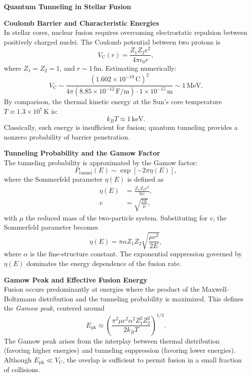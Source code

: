 \begin{technical}
    {\Large\textbf{Quantum Tunneling in Stellar Fusion}}
    
    \textbf{Coulomb Barrier and Characteristic Energies}\\[0.5em]
    In stellar cores, nuclear fusion requires overcoming electrostatic repulsion between positively charged nuclei. The Coulomb potential between two protons is
    \[
    V_\text{C}(r) = \frac{Z_1 Z_2 e^2}{4\pi \epsilon_0 r},
    \]
    where \( Z_1 = Z_2 = 1 \), and \( r \sim 1\,\text{fm} \). Estimating numerically:
    \[
    V_\text{C} \sim \frac{(1.602 \times 10^{-19}\,\text{C})^2}{4\pi (8.85 \times 10^{-12}\,\text{F/m}) \cdot 1 \times 10^{-15}\,\text{m}} \sim 1\,\text{MeV}.
    \]
    By comparison, the thermal kinetic energy at the Sun’s core temperature \( T \approx 1.3 \times 10^7\,\text{K} \) is:
    \[
    k_B T \approx 1\,\text{keV}.
    \]
    Classically, such energy is insufficient for fusion; quantum tunneling provides a nonzero probability of barrier penetration.
    
    \vspace{0.7em}
    \textbf{Tunneling Probability and the Gamow Factor}\\[0.5em]
    The tunneling probability is approximated by the Gamow factor:
    \[
    P_\text{tunnel}(E) \sim \exp\left[-2\pi \eta(E)\right],
    \]
    where the Sommerfeld parameter \(\eta(E)\) is defined as
    \begin{align*}
    \eta(E) &= \frac{Z_1 Z_2 e^2}{\hbar v}, \\
    v &= \sqrt{\frac{2E}{\mu}},
    \end{align*}
    with \(\mu\) the reduced mass of the two-particle system. Substituting for \(v\), the Sommerfeld parameter becomes
    \[
    \eta(E) = \pi \alpha Z_1 Z_2 \sqrt{\frac{\mu c^2}{2E}},
    \]
    where \(\alpha\) is the fine-structure constant. The exponential suppression governed by \(\eta(E)\) dominates the energy dependence of the fusion rate.
    
    \vspace{0.7em}
    \textbf{Gamow Peak and Effective Fusion Energy}\\[0.5em]
    Fusion occurs predominantly at energies where the product of the Maxwell–Boltzmann distribution and the tunneling probability is maximized. This defines the \emph{Gamow peak}, centered around
    \[
    E_\text{pk} \approx \left( \frac{\pi^2 \mu c^2 \alpha^2 Z_1^2 Z_2^2}{2 k_B T} \right)^{1/3}.
    \]
    The Gamow peak arises from the interplay between thermal distribution (favoring higher energies) and tunneling suppression (favoring lower energies). Although \( E_\text{pk} \ll V_\text{C} \), the overlap is sufficient to permit fusion in a small fraction of collisions.
    

\end{technical}
